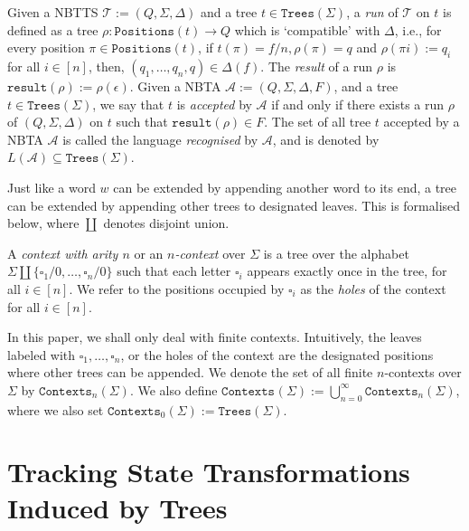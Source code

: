 \documentclass[12pt, a4paper]{article}
\newcommand{\T}{\mathcal{T}}
\newcommand{\tsig}{\Trees{\Alphabet}}
\newcommand{\Alphabet}{\ensuremath{\Sigma}}
\newcommand{\Trees}[1]{\ensuremath{\texttt{Trees}\left(#1\right)}}
\newcommand{\Contexts}[2]{\ensuremath{\texttt{Contexts}_{#2}\left(#1\right)}}
\newcommand{\Positions}{\texttt{Positions}}
\newcommand{\Transitions}{\ensuremath{\Delta}}
\newcommand{\result}{\texttt{result}}
\newcommand{\automaton}{\ensuremath{\mathcal{A}}}
\begin{document}
\begin{definition}\label{def:acceptanceByNbta}
    Given a NBTTS $\T := (Q, \Alphabet, \Transitions)$ and a tree $t \in \tsig$, a \emph{run} of $\T$ on $t$ is defined as a tree $\rho : \Positions(t) \to Q$ which is `compatible' with $\Transitions$, i.e., for every position $\pi \in \Positions(t)$, if $t(\pi) = f/n, \rho(\pi) = q$ and $\rho(\pi i) := q_i$ for all $i \in [n]$, then, $(q_1, \dots, q_n, q) \in \Transitions(f)$. The \emph{result} of a run $\rho$ is $\result(\rho) := \rho(\epsilon)$. Given a NBTA $\automaton := (Q, \Alphabet, \Transitions, F)$, and a tree $t \in \tsig$, we say that $t$ is \emph{accepted} by $\automaton$ if and only if there exists a run $\rho$ of $(Q, \Alphabet, \Transitions)$ on $t$ such that $\result(\rho) \in F$. The set of all tree $t$ accepted by a NBTA $\automaton$ is called the language \emph{recognised} by $\automaton$, and is denoted by $L(\automaton) \subseteq \tsig$.
\end{definition}

Just like a word $w$ can be extended by appending another word to its end, a tree can be extended by appending other trees to designated leaves. This is formalised below, where $ \coprod$ denotes disjoint union.

\begin{definition}[Context]\label{def:context}
    A \emph{context with arity $n$} or an \emph{$n$-context} over $\Alphabet$ is a tree over the alphabet $\Alphabet \coprod \{\square_1/0, \dots, \square_n/0\}$ such that each letter $\square_i$ appears exactly once in the tree, for all $i \in [n]$. We refer to the positions occupied by $\square_i$ as the \emph{holes} of the context for all $i \in [n]$.
\end{definition}
In this paper, we shall only deal with finite contexts. Intuitively, the leaves labeled with $\square_1, \dots, \square_n$, or the holes of the context are the designated positions where other trees can be appended. We denote the set of all finite $n$-contexts over $\Alphabet$ by $\Contexts{\Alphabet}{n}$. We also define $\Contexts{\Alphabet}{} := \bigcup_{n=0}^\infty \Contexts{\Alphabet}{n}$, where we also set $\Contexts{\Alphabet}{0} := \tsig$.

\section{Tracking State Transformations Induced by Trees}\label{sec:tech-prel}
\end{document}
